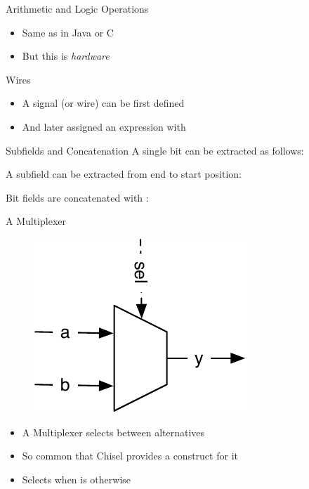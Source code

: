 \begin{frame}[fragile]{Arithmetic and Logic Operations}
\begin{itemize}
\item Same as in Java or C
\item But this is \emph{hardware}
\end{itemize}
\end{frame}

\begin{frame}[fragile]{Wires}
\begin{itemize}
\item A signal (or wire) can be first defined
\item And later assigned an expression with \code{:=}
\end{itemize}
\end{frame}

\begin{frame}[fragile]{Subfields and Concatenation}
A single bit can be extracted as follows:

\noindent A subfield can be extracted from end to start position:

\noindent Bit fields are concatenated with :
\end{frame}


\begin{frame}[fragile]{A Multiplexer}
\begin{figure}
  \includegraphics[scale=\scale]{../figures/mux}
\end{figure}
\begin{itemize}
\item A Multiplexer selects between alternatives
\item So common that Chisel provides a construct for it
\item Selects  when  is  otherwise 
\end{itemize}
\end{frame}


